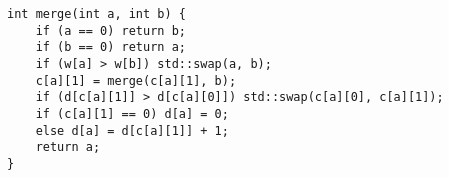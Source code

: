 \begin{lstlisting}
int merge(int a, int b) {
	if (a == 0) return b;
	if (b == 0) return a;
	if (w[a] > w[b]) std::swap(a, b);
	c[a][1] = merge(c[a][1], b);
	if (d[c[a][1]] > d[c[a][0]]) std::swap(c[a][0], c[a][1]);
	if (c[a][1] == 0) d[a] = 0;
	else d[a] = d[c[a][1]] + 1;
	return a;
}
\end{lstlisting}
